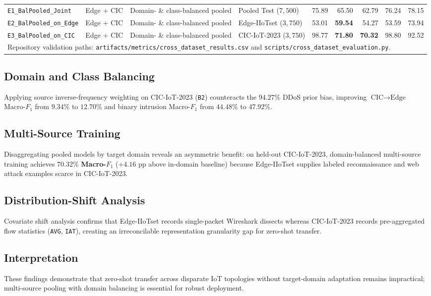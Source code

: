 \documentclass[10pt,journal,twocolumn]{IEEEtran}
\begin{document}
\begin{table}[t]
{\begin{tabular}{llllrrrrr}
\midrule
\texttt{E1\_BalPooled\_Joint} & Edge + CIC & Domain- \& class-balanced pooled & Pooled Test ($7,500$) & 75.89 & 65.50 & 62.79 & 76.24 & 78.15 \\
\texttt{E2\_BalPooled\_on\_Edge} & Edge + CIC & Domain- \& class-balanced pooled & Edge-IIoTset ($3,750$) & 53.01 & \textbf{59.54} & 54.27 & 53.59 & 73.94 \\
\texttt{E3\_BalPooled\_on\_CIC} & Edge + CIC & Domain- \& class-balanced pooled & CIC-IoT-2023 ($3,750$) & 98.77 & \textbf{71.80} & \textbf{70.32} & 98.80 & 92.52 \\
\midrule
\multicolumn{9}{l}{\footnotesize Repository validation paths: \texttt{artifacts/metrics/cross\_dataset\_results.csv} and \texttt{scripts/cross\_dataset\_evaluation.py}.} \\
\bottomrule
\end{tabular}}
\end{table}

\subsection{Domain and Class Balancing}
Applying source inverse-frequency weighting on CIC-IoT-2023 (\texttt{B2}) counteracts the $94.27\%$ DDoS prior bias, improving $\text{CIC}\to\text{Edge}$ Macro-$F_1$ from $9.34\%$ to $12.70\%$ and binary intrusion Macro-$F_1$ from $44.48\%$ to $47.92\%$.

\subsection{Multi-Source Training}
Disaggregating pooled models by target domain reveals an asymmetric benefit: on held-out CIC-IoT-2023, domain-balanced multi-source training achieves $\mathbf{70.32\%}$ \textbf{Macro-$F_1$} ($+4.16\text{ pp}$ above in-domain baseline) because Edge-IIoTset supplies labeled reconnaissance and web attack examples scarce in CIC-IoT-2023.

\subsection{Distribution-Shift Analysis}
Covariate shift analysis confirms that Edge-IIoTset records single-packet Wireshark dissects whereas CIC-IoT-2023 records pre-aggregated flow statistics (\texttt{AVG}, \texttt{IAT}), creating an irreconcilable representation granularity gap for zero-shot transfer.

\subsection{Interpretation}
These findings demonstrate that zero-shot transfer across disparate IoT topologies without target-domain adaptation remains impractical; multi-source pooling with domain balancing is essential for robust deployment.
\end{document}
